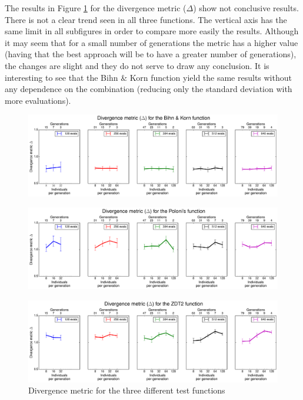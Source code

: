 The results in Figure \ref{fig:diverMetric} for the divergence metric ($\Delta$) show not conclusive results. There is not a clear trend seen in all three functions. The vertical axis has the same limit in all subfigures in order to compare more easily the results. Although it may seem that for a small number of generations the metric has a higher value (having that the best approach will be to have a greater number of generations), the changes are slight and they do not serve to draw any conclusion. It is interesting to see that the Bihn \& Korn function yield the same results without any dependence on the combination (reducing only the standard deviation with more evaluations).

    \newpage
    
    \begin{figure}[h!]
        \centering
        \includegraphics[width=\textwidth]{Figures/3/diverMetric_BK.pdf}
    \end{figure}
    \begin{figure}[h!]
        \centering
        \includegraphics[width=\textwidth]{Figures/3/diverMetric_POL.pdf}
    \end{figure}
    \begin{figure}[h!]
        \centering
        \includegraphics[width=\textwidth]{Figures/3/diverMetric_ZDT.pdf}
        \caption{Divergence metric for the three different test functions}
        \label{fig:diverMetric}
    \end{figure}

